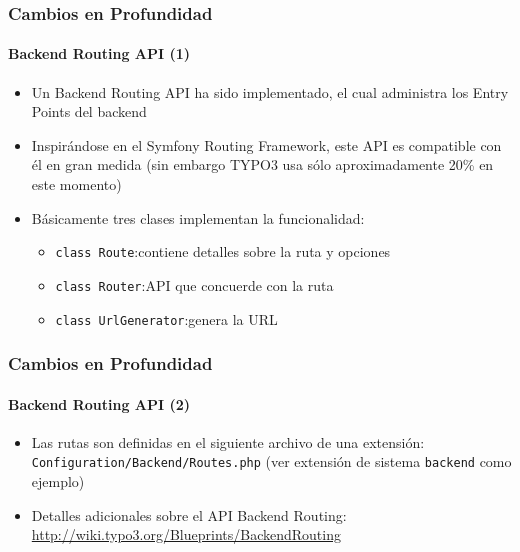 \begin{frame}[fragile]
	\frametitle{Cambios en Profundidad}
	\framesubtitle{Backend Routing API (1)}

	\begin{itemize}
		\item Un Backend Routing API ha sido implementado, el cual administra los Entry Points del backend
		\item Inspirándose en el Symfony Routing Framework, este API es compatible con él en gran medida\newline
			\small(sin embargo TYPO3 usa sólo aproximadamente 20\% en este momento)\normalsize

		\item Básicamente tres clases implementan la funcionalidad:
			\begin{itemize}
				\item \texttt{class Route}:\tabto{3.6cm}contiene detalles sobre la ruta y opciones
				\item \texttt{class Router}:\tabto{3.6cm}API que concuerde con la ruta
				\item \texttt{class UrlGenerator}:\tabto{3.6cm}genera la URL
			\end{itemize}
	\end{itemize}

\end{frame}

\begin{frame}[fragile]
	\frametitle{Cambios en Profundidad}
	\framesubtitle{Backend Routing API (2)}

	\begin{itemize}

		\item Las rutas son definidas en el siguiente archivo de una extensión:
			\texttt{Configuration/Backend/Routes.php}\newline
			(ver extensión de sistema \texttt{backend} como ejemplo)

		\item Detalles adicionales sobre el API Backend Routing:\newline
			\small\url{http://wiki.typo3.org/Blueprints/BackendRouting}\normalsize

	\end{itemize}

\end{frame}

